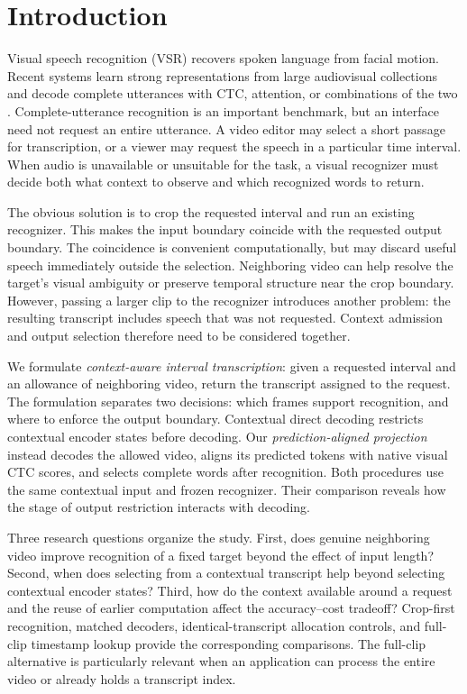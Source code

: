 \section{Introduction}

Visual speech recognition (VSR) recovers spoken language from facial motion.
Recent systems learn strong representations from large audiovisual collections and
decode complete utterances with CTC, attention, or combinations of the two
\citep{graves2006ctc,watanabe2017hybrid,ma2023autoavsr}.
Complete-utterance recognition is an important benchmark, but an interface need
not request an entire utterance. A video editor may select a short passage for
transcription, or a viewer may request the speech in a particular time interval.
When audio is unavailable or unsuitable for the task, a visual recognizer must
decide both what context to observe and which recognized words to return.

The obvious solution is to crop the requested interval and run an existing
recognizer. This makes the input boundary coincide with the requested output
boundary. The coincidence is convenient computationally, but may discard useful
speech immediately outside the selection. Neighboring video can help resolve
the target's visual ambiguity or preserve temporal structure near the crop
boundary. However, passing a larger clip to the recognizer introduces another
problem: the resulting transcript includes speech that was not requested.
Context admission and output selection therefore need to be considered together.

We formulate \emph{context-aware interval transcription}: given a requested
interval and an allowance of neighboring video, return the transcript assigned
to the request. The formulation separates two decisions: which frames support
recognition, and where to enforce the output boundary. Contextual direct decoding
restricts contextual encoder states before decoding. Our
\emph{prediction-aligned projection} instead decodes the allowed video, aligns
its predicted tokens with native visual CTC scores, and selects complete words
after recognition. Both procedures use the same contextual input and frozen
recognizer. Their comparison reveals how the stage of output restriction
interacts with decoding.

Three research questions organize the study. First, does genuine neighboring
video improve recognition of a fixed target beyond the effect of input length?
Second, when does selecting from a contextual transcript help beyond selecting
contextual encoder states? Third, how do the context available around a request
and the reuse of earlier computation affect the accuracy--cost tradeoff?
Crop-first recognition, matched decoders, identical-transcript allocation
controls, and full-clip timestamp lookup provide the corresponding comparisons.
The full-clip alternative is particularly relevant when an application can
process the entire video or already holds a transcript index.

